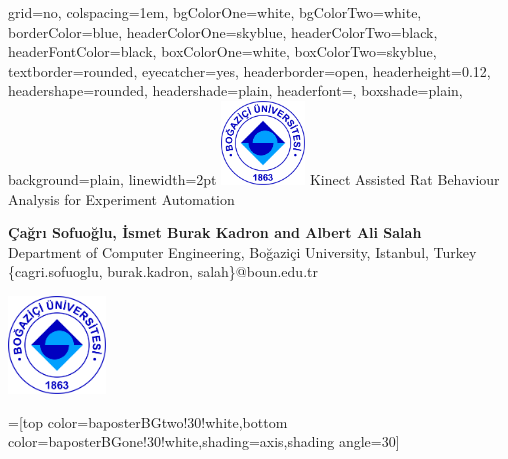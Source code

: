 \documentclass[landscape,final]{baposter}
\begin{document}
\begin{poster}{
  grid=no,
  colspacing=1em,
  bgColorOne=white,
  bgColorTwo=white,
  borderColor=blue,
  headerColorOne=skyblue,
  headerColorTwo=black,
  headerFontColor=black,
  boxColorOne=white,
  boxColorTwo=skyblue,
  textborder=rounded,
  eyecatcher=yes,
  headerborder=open,
  headerheight=0.12\textheight,
  headershape=rounded,
  headershade=plain,
  headerfont=\Large\textsf, %
  boxshade=plain,
  background=plain,
  linewidth=2pt
  }
  {\includegraphics[height=6em]{figures/Bogazici_University_Logo.png}} %
  {\sf \vspace{5pt}%
  \vspace{-14pt}
  Kinect Assisted Rat Behaviour Analysis for Experiment Automation
}
  {\sf \Large \vspace{5pt} %
  	\textbf{Çağrı Sofuoğlu, İsmet Burak Kadron and Albert Ali Salah}\\
    Department of Computer Engineering, Bo\u{g}azi\c{c}i University, Istanbul, Turkey\\
    \{cagri.sofuoglu, burak.kadron, salah\}@boun.edu.tr

  }
  {\includegraphics[height=7em]{figures/Bogazici_University_Logo.png}
  }

  =[top color=baposterBGtwo!30!white,bottom color=baposterBGone!30!white,shading=axis,shading angle=30]

     \newlength{\leftimgwidth}
     \setlength{\leftimgwidth}{0.78em+8.0em}


\end{poster}
\end{document}
